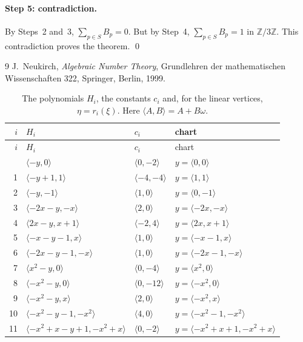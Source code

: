 \documentclass[11pt]{article}
\newcommand{\Z}{\mathbb{Z}}
\begin{document}
\paragraph{Step 5: contradiction.} By Steps~2 and~3, $\sum_{p\in S}B_p=0$. But by Step~4, $\sum_{p\in S}B_p=1$ in $\Z/3\Z$. This contradiction proves the theorem.
\qed


\begin{thebibliography}{9}
 J.~Neukirch, \emph{Algebraic Number Theory}, Grundlehren der mathematischen Wissenschaften 322, Springer, Berlin, 1999.
\end{thebibliography}

\clearpage
\begingroup\small
\setlength{\LTcapwidth}{\textwidth}
\begin{longtable}{@{}rlll@{}}
\caption{The polynomials $H_i$, the constants $c_i$ and, for the linear vertices, $\eta=r_i(\xi)$. Here $\langle A,B\rangle=A+B\omega$.}\label{tab:vert1}\\
\hline $i$ & $H_i$ & $c_i$ & chart\\\hline\endfirsthead\hline $i$ & $H_i$ & $c_i$ & chart\\\hline\endhead\hline\endfoot
0 & $\langle -y,0\rangle$ & $\langle 0,-2\rangle$ & $y=\langle 0,0\rangle$\\
1 & $\langle -y+1,1\rangle$ & $\langle -4,-4\rangle$ & $y=\langle 1,1\rangle$\\
2 & $\langle -y,-1\rangle$ & $\langle 1,0\rangle$ & $y=\langle 0,-1\rangle$\\
3 & $\langle -2x-y,-x\rangle$ & $\langle 2,0\rangle$ & $y=\langle -2x,-x\rangle$\\
4 & $\langle 2x-y,x+1\rangle$ & $\langle -2,4\rangle$ & $y=\langle 2x,x+1\rangle$\\
5 & $\langle -x-y-1,x\rangle$ & $\langle 1,0\rangle$ & $y=\langle -x-1,x\rangle$\\
6 & $\langle -2x-y-1,-x\rangle$ & $\langle 1,0\rangle$ & $y=\langle -2x-1,-x\rangle$\\
7 & $\langle x^{2}-y,0\rangle$ & $\langle 0,-4\rangle$ & $y=\langle x^{2},0\rangle$\\
8 & $\langle -x^{2}-y,0\rangle$ & $\langle 0,-12\rangle$ & $y=\langle -x^{2},0\rangle$\\
9 & $\langle -x^{2}-y,x\rangle$ & $\langle 2,0\rangle$ & $y=\langle -x^{2},x\rangle$\\
10 & $\langle -x^{2}-y-1,-x^{2}\rangle$ & $\langle 4,0\rangle$ & $y=\langle -x^{2}-1,-x^{2}\rangle$\\
11 & $\langle -x^{2}+x-y+1,-x^{2}+x\rangle$ & $\langle 0,-2\rangle$ & $y=\langle -x^{2}+x+1,-x^{2}+x\rangle$\\

\end{longtable}
\end{document}
